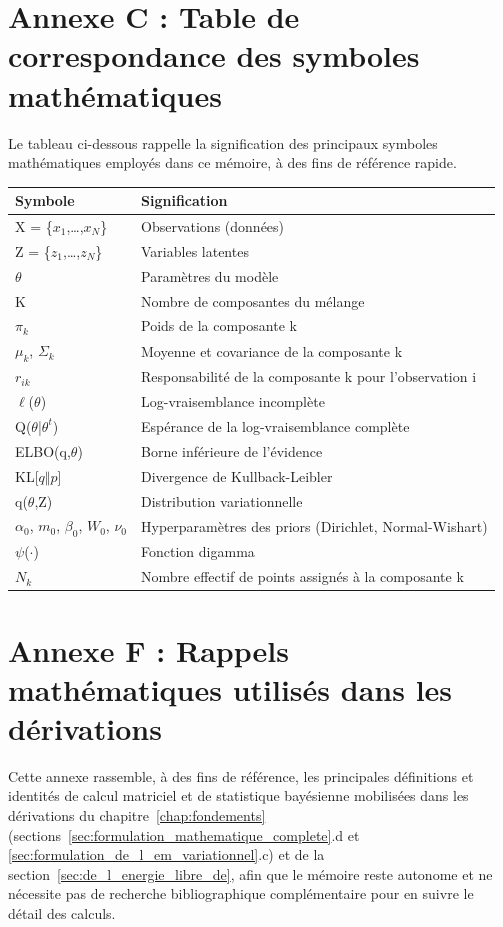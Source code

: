\section*{Annexe C : Table de correspondance des symboles mathématiques}
Le tableau ci-dessous rappelle la signification des principaux symboles mathématiques employés dans ce mémoire, à des fins de référence rapide.

\begin{table}[H]
\centering
\small
\setlength{\tabcolsep}{0.14cm}
\begin{tabular}{|p{7.42cm}|p{7.42cm}|}
\hline
\textbf{Symbole} & \textbf{Signification} \\
\hline
X = \{$x_{1}$,\ldots{},$x_{N}$\} & Observations (données) \\
\hline
Z = \{$z_{1}$,\ldots{},$z_{N}$\} & Variables latentes \\
\hline
$\theta $ & Paramètres du modèle \\
\hline
K & Nombre de composantes du mélange \\
\hline
$\pi _{k}$ & Poids de la composante k \\
\hline
$\mu _{k}$, $\Sigma _{k}$ & Moyenne et covariance de la composante k \\
\hline
$r_{ik}$ & Responsabilité de la composante k pour l'observation i \\
\hline
$\ell $($\theta $) & Log-vraisemblance incomplète \\
\hline
Q($\theta $|$\theta ^{t}$) & Espérance de la log-vraisemblance complète \\
\hline
ELBO(q,$\theta $) & Borne inférieure de l'évidence \\
\hline
KL[$q\Vert p$] & Divergence de Kullback-Leibler \\
\hline
q($\theta $,Z) & Distribution variationnelle \\
\hline
$\alpha _{0}$, $m_{0}$, $\beta _{0}$, $W_{0}$, $\nu _{0}$ & Hyperparamètres des priors (Dirichlet, Normal-Wishart) \\
\hline
$\psi $($\cdot $) & Fonction digamma \\
\hline
$N_{k}$ & Nombre effectif de points assignés à la composante k \\
\hline
\end{tabular}
\end{table}
\section*{Annexe F : Rappels mathématiques utilisés dans les dérivations}
Cette annexe rassemble, à des fins de référence, les principales définitions et identités de calcul matriciel et de statistique bayésienne mobilisées dans les dérivations du chapitre~\ref{chap:fondements} (sections~\ref{sec:formulation_mathematique_complete}.d et \ref{sec:formulation_de_l_em_variationnel}.c) et de la section~\ref{sec:de_l_energie_libre_de}, afin que le mémoire reste autonome et ne nécessite pas de recherche bibliographique complémentaire pour en suivre le détail des calculs.


